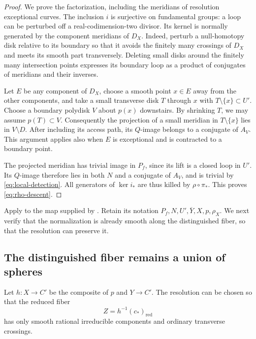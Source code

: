 \begin{proof}
We prove the factorization, including the meridians of resolution
exceptional curves.  The inclusion $i$ is surjective on fundamental
groups: a loop can be perturbed off a real-codimension-two divisor.
Its kernel is normally generated by the component meridians of $D_X$.
Indeed, perturb a null-homotopy disk relative to its boundary so that
it avoids the finitely many crossings of $D_X$ and meets its smooth
part transversely.  Deleting small disks around the finitely many
intersection points expresses its boundary loop as a product of
conjugates of meridians and their inverses.

Let $E$ be any component of $D_X$, choose a smooth point $x\in E$
away from the other components, and take a small transverse disk
$T$ through $x$ with $T\setminus\{x\}\subset U'$.  Choose a boundary
polydisk $V$ about $p(x)$ downstairs.  By shrinking $T$, we may assume
$p(T)\subset V$.  Consequently the projection of a small meridian
in $T\setminus\{x\}$ lies in $V\setminus D$.  After including its
access path, its $Q$-image belongs to a conjugate of $A_V$.
This argument applies also when $E$ is exceptional and is contracted
to a boundary point.

The projected meridian has trivial image in $P_f$, since its lift is
a closed loop in $U'$.  Its $Q$-image therefore lies in both $N$ and
a conjugate of $A_V$, and is trivial by
\eqref{eq:local-detection}.  All generators of $\ker i_*$ are thus
killed by $\rho\circ\pi_*$.  This proves
\eqref{eq:rho-descent}.
\end{proof}

Apply  to the map supplied by
.  Retain its notation
$P_f,N,U',\overline Y,X,p,\rho_X$.  We next verify that the
normalization is already smooth along the distinguished fiber, so
that the resolution can preserve it.

\subsection{The distinguished fiber remains a union of spheres}

\begin{lemma}
\label{lem:rational-special-fiber}
Let $h:X\to C'$ be the composite of $p$ and $Y\to C'$.  The
resolution can be chosen so that the reduced fiber
\[
  Z=h^{-1}(c_*)_{\mathrm{red}}
\]
has only smooth rational irreducible components and ordinary
transverse crossings.
\end{lemma}

